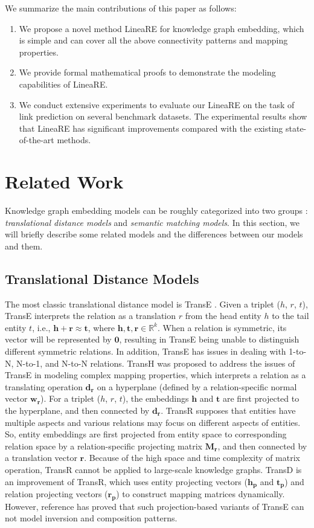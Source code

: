 \documentclass[conference]{IEEEtran}
\begin{document}
We summarize the main contributions of this paper as follows:
\begin{enumerate}
	\item We propose a novel method LineaRE for knowledge graph embedding, which is simple and can cover all the above connectivity patterns and mapping properties.
	\item We provide formal mathematical proofs to demonstrate the modeling capabilities of LineaRE.
	\item We conduct extensive experiments to evaluate our LineaRE on the task of link prediction on several benchmark datasets. The experimental results show that LineaRE has significant improvements compared with the existing state-of-the-art methods.
\end{enumerate}

\section{Related Work}
Knowledge graph embedding models can be roughly categorized into two groups \cite{Survey}: \textit{translational distance models} and \textit{semantic matching models}. In this section, we will briefly describe some related models and the differences between our models and them.

\subsection{Translational Distance Models}
The most classic translational distance model is TransE \cite{TransE}. Given a triplet ($h$, $r$, $t$), TransE interprets the relation as a translation $r$ from the head entity $h$ to the tail entity $t$, i.e., $\bm{h} + \bm{r} \approx \bm{t}$, where $\bm{h}, \bm{t}, \bm{r} \in \mathbb{R}^{k}$. When a relation is symmetric, its vector will be represented by $\bm{0}$, resulting in TransE being unable to distinguish different symmetric relations. In addition, TransE has issues in dealing with 1-to-N, N-to-1, and N-to-N relations. TransH \cite{TransH} was proposed to address the issues of TransE in modeling complex mapping properties, which interprets a relation as a translating operation $\bm{d_r}$ on a hyperplane (defined by a relation-specific normal vector $\bm{w_r}$). For a triplet ($h$, $r$, $t$), the embeddings $\bm{h}$ and $\bm{t}$ are first projected to the hyperplane, and then connected by $\bm{d_r}$. TransR \cite{TransR} supposes that entities have multiple aspects and various relations may focus on different aspects of entities. So, entity embeddings are first projected from entity space to corresponding relation space by a relation-specific projecting matrix $\bm{M_r}$, and then connected by a translation vector $\bm{r}$. Because of the high space and time complexity of matrix operation, TransR cannot be applied to large-scale knowledge graphs. TransD \cite{TransD} is an improvement of TransR, which uses entity projecting vectors ($\bm{h_p}$ and $\bm{t_p}$) and relation projecting vectors ($\bm{r_p}$) to construct mapping matrices dynamically. However, reference \cite{RotatE} has proved that such projection-based variants of TransE can not model inversion and composition patterns.
\end{document}
